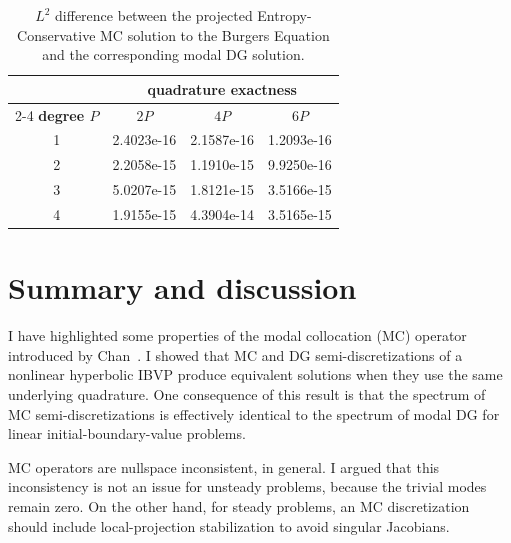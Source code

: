 \documentclass[pdflatex,sn-mathphys-num]{sn-jnl}%
\theoremstyle{thmstyleone}%
\theoremstyle{thmstyletwo}%
\theoremstyle{thmstylethree}%
\begin{document}
\begin{table}[tbp]
\centering
\caption{$L^2$ difference between the projected Entropy-Conservative MC solution to the Burgers Equation and the corresponding modal DG solution.\label{tab:burgers_compare}}
\begin{tabular}{clll}
\rule{0ex}{5ex}
 & \multicolumn{3}{c}{\textbf{quadrature exactness}} \\ \cmidrule{2-4}
\textbf{degree $P$} & \multicolumn{1}{c}{$2P$} & \multicolumn{1}{c}{$4P$} & \multicolumn{1}{c}{$6P$} \\ \hline
\rule{0ex}{3ex}%
1 & 2.4023e-16 & 2.1587e-16 & 1.2093e-16 \\[1ex]
2 & 2.2058e-15 & 1.1910e-15 & 9.9250e-16  \\[1ex]
3 & 5.0207e-15 & 1.8121e-15 & 3.5166e-15 \\[1ex]
4 & 1.9155e-15 & 4.3904e-14 & 3.5165e-15 \\[1ex]\hline
\end{tabular}
\end{table}

\section{Summary and discussion}\label{sec:conclude}


I have highlighted some properties of the modal collocation (MC) operator introduced by Chan~\cite{Chan2018discretely}.  I showed that MC and DG semi-discretizations of a nonlinear hyperbolic IBVP produce equivalent solutions when they use the same underlying quadrature.  One consequence of this result is that the spectrum of MC semi-discretizations is effectively identical to the spectrum of modal DG for linear initial-boundary-value problems.



MC operators are nullspace inconsistent, in general.  I argued that this inconsistency is not an issue for unsteady problems, because the trivial modes remain zero.  On the other hand, for steady problems, an MC discretization should include local-projection stabilization to avoid singular Jacobians. 
\end{document}
